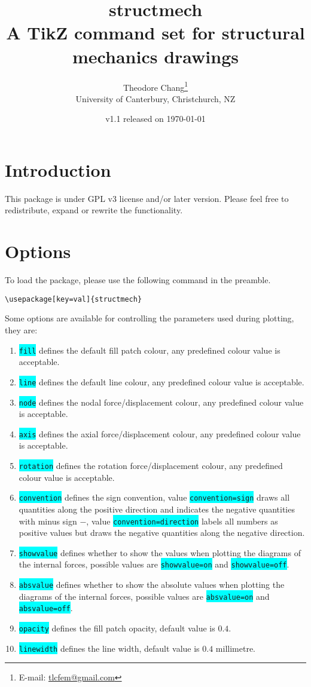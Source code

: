 \documentclass[10pt,a4paper]{article}
\title{structmech\\\large{}A TikZ command set for structural mechanics drawings}
\author{Theodore Chang\footnote{E-mail: \href{tlcfem@gmail.com}{tlcfem@gmail.com}}\\[2mm]\normalsize{}University of Canterbury, Christchurch, NZ}
\date{\normalsize{}v1.1 released on \today}
\newcommand*{\Highlight}[1]{\colorbox{cyan}{\color{red}\texttt{#1}}}
\begin{document}
\maketitle
\section{Introduction}
This package is under GPL v3 license and/or later version. Please feel free to redistribute, expand or rewrite the functionality.
\section{Options}
To load the package, please use the following command in the preamble.
\begin{Verbatim}[frame=single,label=Syntax]
\usepackage[key=val]{structmech}
\end{Verbatim}
Some options are available for controlling the parameters used during plotting, they are:
\begin{enumerate}
\item \Highlight{fill} defines the default fill patch colour, any predefined colour value is acceptable.
\item \Highlight{line} defines the default line colour, any predefined colour value is acceptable.
\item \Highlight{node} defines the nodal force/displacement colour, any predefined colour value is acceptable.
\item \Highlight{axis} defines the axial force/displacement colour, any predefined colour value is acceptable.
\item \Highlight{rotation} defines the rotation force/displacement colour, any predefined colour value is acceptable.
\item \Highlight{convention} defines the sign convention, value \Highlight{convention=sign} draws all quantities along the positive direction and indicates the negative quantities with minus sign $-$, value \Highlight{convention=direction} labels all numbers as positive values but draws the negative quantities along the negative direction.
\item \Highlight{showvalue} defines whether to show the values when plotting the diagrams of the internal forces, possible values are \Highlight{showvalue=on} and \Highlight{showvalue=off}.
\item \Highlight{absvalue} defines whether to show the absolute values when plotting the diagrams of the internal forces, possible values are \Highlight{absvalue=on} and \Highlight{absvalue=off}.
\item \Highlight{opacity} defines the fill patch opacity, default value is $0.4$.
\item \Highlight{linewidth} defines the line width, default value is $0.4$ millimetre.
\end{enumerate}
\end{document}
